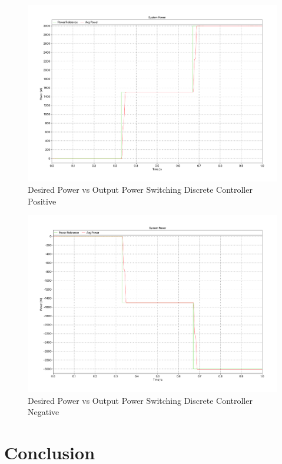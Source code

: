 \documentclass[12pt]{article}
\begin{document}
\begin{figure}[ht]
    \centering{}
    \includegraphics[width=\textwidth, height=0.4\textheight, keepaspectratio]{img/Switching Z-C Power Positive.pdf}
    \caption{Desired Power vs Output Power Switching Discrete Controller Positive}
    \label{fig:switching-z-c-power-positive}
\end{figure}

\begin{figure}[ht]
    \centering{}
    \includegraphics[width=\textwidth, height=0.4\textheight, keepaspectratio]{img/Switching Z-C Power Negative.pdf}
    \caption{Desired Power vs Output Power Switching Discrete Controller Negative}
    \label{fig:switching-z-c-power-negative}
\end{figure}

\section{Conclusion}
\end{document}
